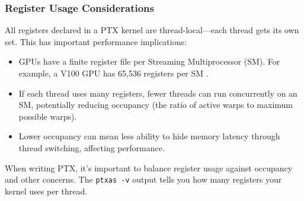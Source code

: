 \subsubsection{Register Usage Considerations}

All registers declared in a PTX kernel are thread-local—each thread gets its own set. This has important performance implications:

\begin{itemize}
    \item GPUs have a finite register file per Streaming Multiprocessor (SM). For example, a V100 GPU has 65,536 registers per SM \citep{cornell_gpu_memory}.
    
    \item If each thread uses many registers, fewer threads can run concurrently on an SM, potentially reducing occupancy (the ratio of active warps to maximum possible warps).
    
    \item Lower occupancy can mean less ability to hide memory latency through thread switching, affecting performance.
\end{itemize}

When writing PTX, it's important to balance register usage against occupancy and other concerns. The \texttt{ptxas -v} output tells you how many registers your kernel uses per thread.


